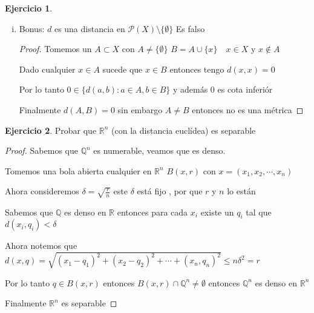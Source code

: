 \documentclass[12pt]{report}
\newcommand{\Q}{\mathbb{Q}}
\newcommand{\R}{\mathbb{R}}
\theoremstyle{definition}
\newtheorem{ej}{Ejercicio}
\begin{document}
\begin{ej}
\begin{enumerate}[i)]
\begin{proof}
      Otra forma sin usar propiedades de ínfimo:

      $d(a,b) \leq d(a,c) + d(c,b) \quad \forall a,b,c \in X$ en particular para $a \in A , b \in B, c \in C$

      pero entonces $\inf\{d(a,b): a \in A , b \in B\} \leq d(a,c) + d(c,b)$

      Luego $\inf\{d(a,b): a \in A , b \in B\} \leq \inf\{d(a,c): a\in A, c \in C\} + d(c,b)$

      De la misma forma:

      $\inf\{d(a,b): a \in A , b \in B\} \leq \inf\{d(a,c): a\in A, c \in C\} + \inf\{d(c,b): c\in C , b \in B\}$

      Entonces $d(A,B) \leq d(A,C) + d(C,B)$
      \end{proof}

	\item Bonus: $d$ es una distancia en $\mathcal{P}(X) \setminus \{\emptyset\}$ Es falso
      	\begin{proof}
	Tomemos un $A \subset X$ con $A \neq \{\emptyset\}$  $B = A \cup \{x\} \quad x \in X$ y $x \notin A$

	Dado cualquier $x \in A$ sucede que $x \in B$ entonces tengo $d(x,x) = 0$ 

	Por lo tanto $0 \in \{d(a,b): a\in A, b \in B\}$ y además 0 es cota inferiór

	Finalmente $d(A,B) = 0$ sin embargo $A \neq B$ entonces no es una métrica
	\end{proof}

  \end{enumerate}
\end{ej}

\begin{ej}
	Probar que $\R^n$ (con la distancia euclídea) es separable 
	\begin{proof}
		Sabemos que $\Q^n$ es numerable, veamos que es denso. 

		Tomemos una bola abierta cualquier en $\R^n$ $B(x,r)$ con $x = (x_1,x_2,\cdots, x_n)$

		Ahora consideremos $\delta= \sqrt{\frac{r}{n}}$ este $\delta$ está fijo , por que $r$ y $n$ lo están

		Sabemos que $\Q$ es denso en $\R$ entonces para cada $x_i$ existe un $q_i$ tal que $d(x_i,q_i) < \delta$ 

		Ahora notemos que $d(x,q) = \sqrt{(x_1 - q_1)^2 + (x_2 - q_2)^2 + \cdots + (x_n,q_n)^2} \leq n\delta^2 = r$

		Por lo tanto $q \in B(x,r)$ entonces $B(x,r) \cap \Q^n \neq \emptyset$ entonces $\Q^n$ es denso en $\R^n $

		Finalmente $\R^n$ es separable
	\end{proof}
\end{ej}
\end{document}
